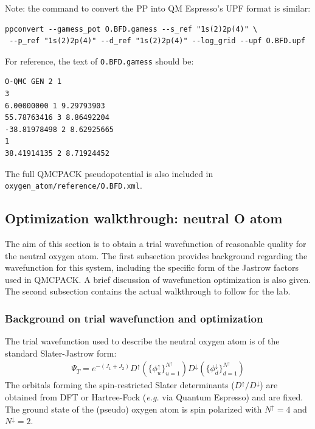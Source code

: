 Note: the command to convert the PP into QM Espresso's UPF format is similar:
\begin{shaded}
\begin{verbatim}
ppconvert --gamess_pot O.BFD.gamess --s_ref "1s(2)2p(4)" \
 --p_ref "1s(2)2p(4)" --d_ref "1s(2)2p(4)" --log_grid --upf O.BFD.upf
\end{verbatim}
\end{shaded}

For reference, the text of \texttt{O.BFD.gamess} should be:
\begin{shaded}
\begin{verbatim}
O-QMC GEN 2 1
3
6.00000000 1 9.29793903
55.78763416 3 8.86492204
-38.81978498 2 8.62925665
1
38.41914135 2 8.71924452

\end{verbatim}
\end{shaded}
\noindent
The full QMCPACK pseudopotential is also included in \texttt{oxygen\_atom/reference/O.BFD.xml}.


\subsection{Optimization walkthrough: neutral O atom}\label{sec:optimization_walkthrough}
The aim of this section is to obtain a trial wavefunction of reasonable quality 
for the neutral oxygen atom.  The first subsection provides background regarding 
the wavefunction for this system, including the specific form of the Jastrow 
factors used in QMCPACK.  A brief discussion of wavefunction optimization is 
also given.  The second subsection contains the actual walkthrough to follow 
for the lab. 

\subsubsection{Background on trial wavefunction and optimization}\label{sec:opt_background}
The trial wavefunction used to describe the neutral oxygen atom is of the 
standard Slater-Jastrow form:
\begin{align}  
  \Psi_T = e^{-(J_1+J_2)}D^\uparrow(\{\phi_u^\uparrow\}_{u=1}^{N^\uparrow})D^\downarrow(\{\phi_d^\downarrow\}_{d=1}^{N^\uparrow})
\end{align}
The orbitals forming the spin-restricted Slater determinants 
($D^\uparrow/D^\downarrow$) are obtained from DFT or Hartree-Fock (\emph{e.g.} via Quantum Espresso) 
and are fixed.  The ground state of the (pseudo) oxygen atom is spin polarized 
with $N^{\uparrow}=4$ and $N^{\downarrow}=2$.  


